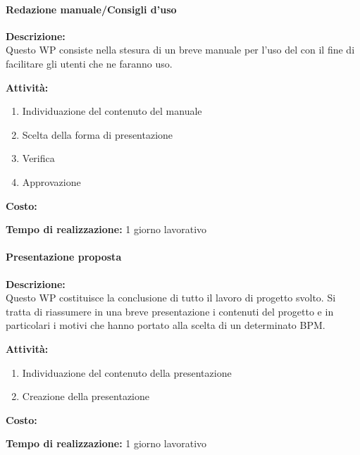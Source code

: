 \paragraph{Redazione manuale/Consigli d'uso}
\begin{description}
\item{\bfseries Descrizione:}\\
Questo WP consiste nella stesura di un breve manuale per l'uso del  con il fine di facilitare gli utenti che ne faranno uso.

\item  {\bfseries Attività:}
	\begin{enumerate}
	\item Individuazione del contenuto del manuale
	\item Scelta della forma di presentazione
	\item Verifica 
 	\item Approvazione	
	\end{enumerate}

\item  {\bfseries Costo:}
\item  {\bfseries Tempo di realizzazione:}  1 giorno lavorativo
\end{description}

\paragraph{Presentazione proposta}
\begin{description}
	\item{\bfseries Descrizione:}\\
Questo WP costituisce la conclusione di tutto il lavoro di progetto svolto. Si tratta di 		riassumere in una breve presentazione i contenuti del progetto e in particolari i motivi che hanno portato alla scelta di un determinato  BPM.

	\item  {\bfseries Attività:}
	\begin{enumerate}
		\item Individuazione del contenuto della presentazione
		\item Creazione della presentazione
	\end{enumerate}
	\item{\bfseries Costo:}
	\item{\bfseries Tempo di realizzazione:}  1 giorno lavorativo
\end{description}

